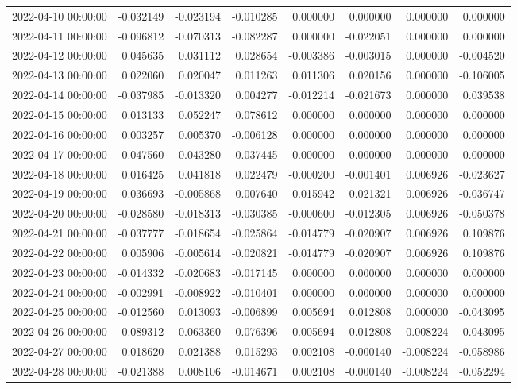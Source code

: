 \begin{tabular}{lrrrrrrr}
2022-04-10 00:00:00 & -0.032149 & -0.023194 & -0.010285 & 0.000000 & 0.000000 & 0.000000 & 0.000000 \\
2022-04-11 00:00:00 & -0.096812 & -0.070313 & -0.082287 & 0.000000 & -0.022051 & 0.000000 & 0.000000 \\
2022-04-12 00:00:00 & 0.045635 & 0.031112 & 0.028654 & -0.003386 & -0.003015 & 0.000000 & -0.004520 \\
2022-04-13 00:00:00 & 0.022060 & 0.020047 & 0.011263 & 0.011306 & 0.020156 & 0.000000 & -0.106005 \\
2022-04-14 00:00:00 & -0.037985 & -0.013320 & 0.004277 & -0.012214 & -0.021673 & 0.000000 & 0.039538 \\
2022-04-15 00:00:00 & 0.013133 & 0.052247 & 0.078612 & 0.000000 & 0.000000 & 0.000000 & 0.000000 \\
2022-04-16 00:00:00 & 0.003257 & 0.005370 & -0.006128 & 0.000000 & 0.000000 & 0.000000 & 0.000000 \\
2022-04-17 00:00:00 & -0.047560 & -0.043280 & -0.037445 & 0.000000 & 0.000000 & 0.000000 & 0.000000 \\
2022-04-18 00:00:00 & 0.016425 & 0.041818 & 0.022479 & -0.000200 & -0.001401 & 0.006926 & -0.023627 \\
2022-04-19 00:00:00 & 0.036693 & -0.005868 & 0.007640 & 0.015942 & 0.021321 & 0.006926 & -0.036747 \\
2022-04-20 00:00:00 & -0.028580 & -0.018313 & -0.030385 & -0.000600 & -0.012305 & 0.006926 & -0.050378 \\
2022-04-21 00:00:00 & -0.037777 & -0.018654 & -0.025864 & -0.014779 & -0.020907 & 0.006926 & 0.109876 \\
2022-04-22 00:00:00 & 0.005906 & -0.005614 & -0.020821 & -0.014779 & -0.020907 & 0.006926 & 0.109876 \\
2022-04-23 00:00:00 & -0.014332 & -0.020683 & -0.017145 & 0.000000 & 0.000000 & 0.000000 & 0.000000 \\
2022-04-24 00:00:00 & -0.002991 & -0.008922 & -0.010401 & 0.000000 & 0.000000 & 0.000000 & 0.000000 \\
2022-04-25 00:00:00 & -0.012560 & 0.013093 & -0.006899 & 0.005694 & 0.012808 & 0.000000 & -0.043095 \\
2022-04-26 00:00:00 & -0.089312 & -0.063360 & -0.076396 & 0.005694 & 0.012808 & -0.008224 & -0.043095 \\
2022-04-27 00:00:00 & 0.018620 & 0.021388 & 0.015293 & 0.002108 & -0.000140 & -0.008224 & -0.058986 \\
2022-04-28 00:00:00 & -0.021388 & 0.008106 & -0.014671 & 0.002108 & -0.000140 & -0.008224 & -0.052294 \\

\end{tabular}
